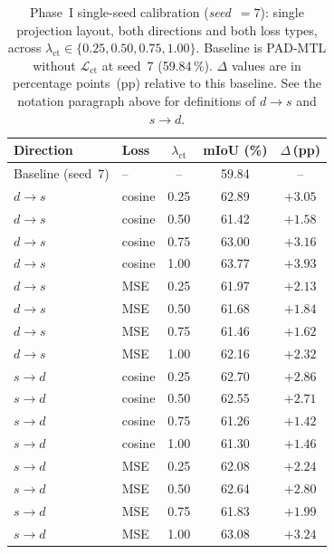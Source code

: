 \begin{table}[H]
\centering
\caption{Phase~I single-seed calibration (\textit{seed}~$=7$): single
projection layout, both directions and both loss types, across
$\lambda_\text{ct} \in \{0.25, 0.50, 0.75, 1.00\}$. Baseline is
PAD-MTL without $\mathcal{L}_\text{ct}$ at seed~7 (59.84\,\%). $\Delta$
values are in percentage points~(pp) relative to this baseline. See the
notation paragraph above for definitions of $d{\rightarrow}s$ and
$s{\rightarrow}d$.}
\label{tab:ct-p1-single}
\renewcommand{\arraystretch}{1.2}
\begin{tabular}{llccc}
\toprule
Direction & Loss & $\lambda_\text{ct}$ & mIoU (\%) & $\Delta$\,(pp) \\
\midrule
Baseline (seed~7) & -- & -- & 59.84 & -- \\
\midrule
$d{\rightarrow}s$ & cosine & 0.25 & 62.89 & $+3.05$ \\
$d{\rightarrow}s$ & cosine & 0.50 & 61.42 & $+1.58$ \\
$d{\rightarrow}s$ & cosine & 0.75 & 63.00 & $+3.16$ \\
$d{\rightarrow}s$ & cosine & 1.00 & 63.77 & $+3.93$ \\
\midrule
$d{\rightarrow}s$ & MSE & 0.25 & 61.97 & $+2.13$ \\
$d{\rightarrow}s$ & MSE & 0.50 & 61.68 & $+1.84$ \\
$d{\rightarrow}s$ & MSE & 0.75 & 61.46 & $+1.62$ \\
$d{\rightarrow}s$ & MSE & 1.00 & 62.16 & $+2.32$ \\
\midrule
$s{\rightarrow}d$ & cosine & 0.25 & 62.70 & $+2.86$ \\
$s{\rightarrow}d$ & cosine & 0.50 & 62.55 & $+2.71$ \\
$s{\rightarrow}d$ & cosine & 0.75 & 61.26 & $+1.42$ \\
$s{\rightarrow}d$ & cosine & 1.00 & 61.30 & $+1.46$ \\
\midrule
$s{\rightarrow}d$ & MSE & 0.25 & 62.08 & $+2.24$ \\
$s{\rightarrow}d$ & MSE & 0.50 & 62.64 & $+2.80$ \\
$s{\rightarrow}d$ & MSE & 0.75 & 61.83 & $+1.99$ \\
$s{\rightarrow}d$ & MSE & 1.00 & 63.08 & $+3.24$ \\
\bottomrule
\end{tabular}
\end{table}

